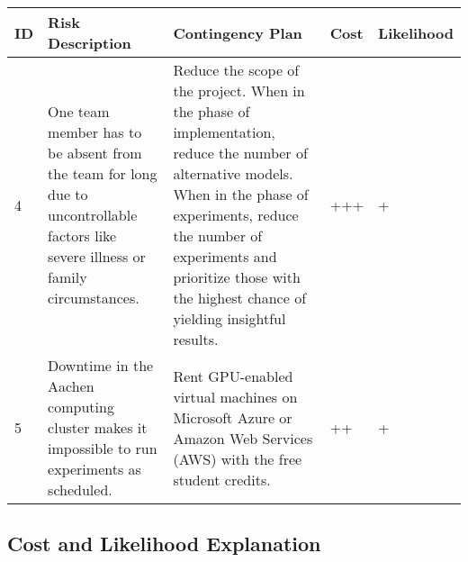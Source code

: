 \begin{center} 
	\small
	\begin{tabular}{  p{} p{} p{} p{} p{} }
		\toprule
		\textbf{ID} & \textbf{Risk Description} & \textbf{Contingency Plan} & \textbf{Cost} & \textbf{Likelihood} 		 \\ 
		\midrule
		4 & 
		One team member has to be absent from the team for long due to uncontrollable factors like severe illness or family circumstances.	 &
		Reduce the scope of the project. When
		in the phase of implementation, reduce
		the number of alternative models. When
		in the phase of experiments, reduce the
		number of experiments and prioritize
		those with the highest chance of yielding insightful results. &
		+++ &
		+  \\
		5 & 
		Downtime in the Aachen computing cluster makes it impossible to run experiments as scheduled. &
		Rent GPU-enabled virtual machines on Microsoft Azure or Amazon Web Services (AWS) with the free student credits. &
		++ &
		+  \\
		\bottomrule
	\end{tabular}
\label{tbl:organizational_risks}
\end{center}

\subsection{Cost and Likelihood Explanation}

